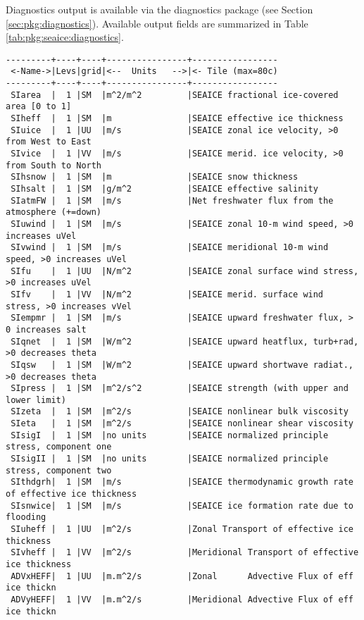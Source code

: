Diagnostics output is available via the diagnostics package
(see Section \ref{sec:pkg:diagnostics}).
Available output fields are summarized in 
Table \ref{tab:pkg:seaice:diagnostics}.

\begin{table}[h!]
\centering
\label{tab:pkg:seaice:diagnostics}
{\footnotesize
\begin{verbatim}
---------+----+----+----------------+-----------------
 <-Name->|Levs|grid|<--  Units   -->|<- Tile (max=80c)
---------+----+----+----------------+-----------------
 SIarea  |  1 |SM  |m^2/m^2         |SEAICE fractional ice-covered area [0 to 1]
 SIheff  |  1 |SM  |m               |SEAICE effective ice thickness
 SIuice  |  1 |UU  |m/s             |SEAICE zonal ice velocity, >0 from West to East
 SIvice  |  1 |VV  |m/s             |SEAICE merid. ice velocity, >0 from South to North
 SIhsnow |  1 |SM  |m               |SEAICE snow thickness
 SIhsalt |  1 |SM  |g/m^2           |SEAICE effective salinity
 SIatmFW |  1 |SM  |m/s             |Net freshwater flux from the atmosphere (+=down)
 SIuwind |  1 |SM  |m/s             |SEAICE zonal 10-m wind speed, >0 increases uVel
 SIvwind |  1 |SM  |m/s             |SEAICE meridional 10-m wind speed, >0 increases uVel
 SIfu    |  1 |UU  |N/m^2           |SEAICE zonal surface wind stress, >0 increases uVel
 SIfv    |  1 |VV  |N/m^2           |SEAICE merid. surface wind stress, >0 increases vVel
 SIempmr |  1 |SM  |m/s             |SEAICE upward freshwater flux, > 0 increases salt
 SIqnet  |  1 |SM  |W/m^2           |SEAICE upward heatflux, turb+rad, >0 decreases theta
 SIqsw   |  1 |SM  |W/m^2           |SEAICE upward shortwave radiat., >0 decreases theta
 SIpress |  1 |SM  |m^2/s^2         |SEAICE strength (with upper and lower limit)
 SIzeta  |  1 |SM  |m^2/s           |SEAICE nonlinear bulk viscosity
 SIeta   |  1 |SM  |m^2/s           |SEAICE nonlinear shear viscosity
 SIsigI  |  1 |SM  |no units        |SEAICE normalized principle stress, component one
 SIsigII |  1 |SM  |no units        |SEAICE normalized principle stress, component two
 SIthdgrh|  1 |SM  |m/s             |SEAICE thermodynamic growth rate of effective ice thickness
 SIsnwice|  1 |SM  |m/s             |SEAICE ice formation rate due to flooding
 SIuheff |  1 |UU  |m^2/s           |Zonal Transport of effective ice thickness
 SIvheff |  1 |VV  |m^2/s           |Meridional Transport of effective ice thickness
 ADVxHEFF|  1 |UU  |m.m^2/s         |Zonal      Advective Flux of eff ice thickn
 ADVyHEFF|  1 |VV  |m.m^2/s         |Meridional Advective Flux of eff ice thickn

\end{verbatim}}
\end{table}
